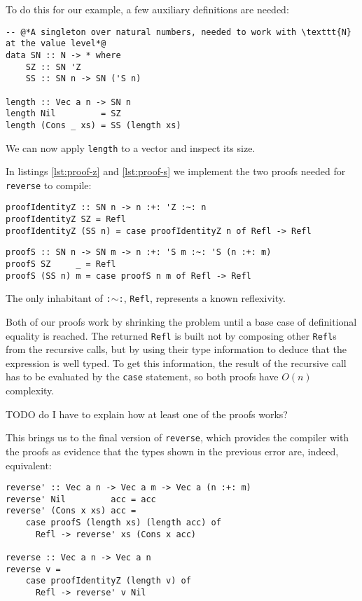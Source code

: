 To do this for our example, a few auxiliary definitions are needed:

\begin{lstlisting}[caption=Bringing \texttt{N} to the value level]
-- @*A singleton over natural numbers, needed to work with \texttt{N} at the value level*@
data SN :: N -> * where
    SZ :: SN 'Z
    SS :: SN n -> SN ('S n)

length :: Vec a n -> SN n
length Nil         = SZ
length (Cons _ xs) = SS (length xs)
\end{lstlisting}

We can now apply \texttt{length} to a vector and inspect its size.

In listings \ref{lst:proof-z} and \ref{lst:proof-s} we implement the two proofs needed for \texttt{reverse} to compile:

\begin{lstlisting}[caption=A proof that \texttt{'Z} is the right identity element in type-level addition, label=lst:proof-z]
proofIdentityZ :: SN n -> n :+: 'Z :~: n
proofIdentityZ SZ = Refl
proofIdentityZ (SS n) = case proofIdentityZ n of Refl -> Refl
\end{lstlisting}

\begin{lstlisting}[caption=A proof that $n+(m+1) \sim (n+m)+1$, label=lst:proof-s]
proofS :: SN n -> SN m -> n :+: 'S m :~: 'S (n :+: m)
proofS SZ     _ = Refl
proofS (SS n) m = case proofS n m of Refl -> Refl
\end{lstlisting}

The only inhabitant of \texttt{:$\sim$:}, \texttt{Refl}, represents a known reflexivity.

Both of our proofs work by shrinking the problem until a base case of definitional equality is reached.
The returned \texttt{Refl} is built not by composing other \texttt{Refl}s from the recursive calls, but by using their type information to deduce that the expression is well typed.
To get this information, the result of the recursive call has to be evaluated by the \texttt{case} statement, so both proofs have $O(n)$ complexity.

TODO do I have to explain how at least one of the proofs works?

This brings us to the final version of \texttt{reverse}, which provides the compiler with the proofs as evidence that the types shown in the previous error are, indeed, equivalent:

\begin{lstlisting}[caption=Length-indexed vector reversal]
reverse' :: Vec a n -> Vec a m -> Vec a (n :+: m)
reverse' Nil         acc = acc
reverse' (Cons x xs) acc =
    case proofS (length xs) (length acc) of
      Refl -> reverse' xs (Cons x acc)

reverse :: Vec a n -> Vec a n
reverse v =
    case proofIdentityZ (length v) of
      Refl -> reverse' v Nil
\end{lstlisting}

